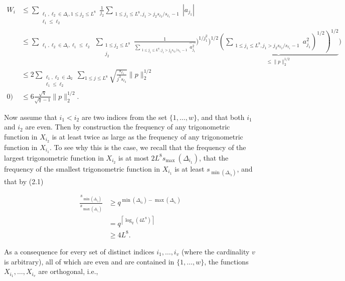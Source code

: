 \documentclass[10pt]{article}
\begin{document}
\begin{align*}
W_{i} & \leqslant \sum_{\substack{\ell_{1}, \ell_{2} \in \Delta_{i}, 1 \leqslant j_{2} \leqslant L^{8} \\
\ell_{1} \leqslant \ell_{2}}} \frac{1}{j_{2}} \sum_{\substack{1 \leqslant j_{1} \leqslant L^{8}, j_{1}>j_{2} s_{\ell_{2}} / s_{\ell_{1}}-1}}\left|a_{j_{1}}\right| \\
& \leqslant \sum_{\substack{\ell_{1}, \ell_{2} \in \Delta_{i}, \ell_{1} \leqslant \ell_{2}}} \sum_{\substack{1 \leqslant j_{2} \leqslant L^{8} \\
j_{2}}} \frac{1}{\sum_{\substack{1 \leqslant j_{1} \leqslant L^{8}, j_{1}>j_{2} s_{\ell_{2}} / s_{\ell_{1}}-1}} \overbrace{a_{j_{1}}^{2}}})^{1 / j_{1}^{2}})^{1 / 2} \underbrace{\left.\left(\sum_{\substack{1 \leqslant j_{1} \leqslant L^{8}, j_{1}>j_{2} s_{\ell_{2}} / s_{\ell_{1}}-1}} a_{j_{1}}^{2}\right)^{1 / 2}\right)^{1 / 2}}_{\leqslant\|p\|_{2}^{1 / 2}}) \\
& \leqslant 2 \sum_{\substack{\ell_{1}, \ell_{2} \in \Delta_{2} \\
\ell_{1} \leqslant \ell_{2}}} \sum_{1 \leqslant j \leqslant L^{8}} \sqrt{\frac{s_{\ell_{1}}}{j^{3} s_{\ell_{2}}}}\|p\|_{2}^{1 / 2} \\
0) & \leqslant 6 \frac{\sqrt{q}}{\sqrt{q}-1}\|p\|_{2}^{1 / 2} . \tag{3.10}
\end{align*}


Now assume that $i_{1}<i_{2}$ are two indices from the set $\{1, \ldots, w\}$, and that both $i_{1}$ and $i_{2}$ are even. Then by construction the frequency of any trigonometric function in $X_{i_{2}}$ is at least twice as large as the frequency of any trigonometric function in $X_{i_{1}}$. To see why this is the case, we recall that the frequency of the largest trigonometric function in $X_{i_{2}}$ is at most $2 L^{8} s_{\text {max }}\left(\Delta_{i_{1}}\right)$, that the frequency of the smallest trigonometric function in $X_{i_{1}}$ is at least $s_{\min \left(\Delta_{i_{2}}\right)}$, and that by (2.1)

$$
\begin{aligned}
\frac{s_{\min \left(\Delta_{i_{2}}\right)}}{s_{\max \left(\Delta_{i_{1}}\right)}} & \geqslant q^{\min \left(\Delta_{i_{2}}\right)-\max \left(\Delta_{i_{1}}\right)} \\
& =q^{\left\lceil\log _{q}\left(4 L^{8}\right)\right\rceil} \\
& \geqslant 4 L^{8} .
\end{aligned}
$$

As a consequence for every set of distinct indices $i_{1}, \ldots, i_{v}$ (where the cardinality $v$ is arbitrary), all of which are even and are contained in $\{1, \ldots, w\}$, the functions $X_{i_{1}}, \ldots, X_{i_{v}}$ are orthogonal, i.e.,
\end{document}
